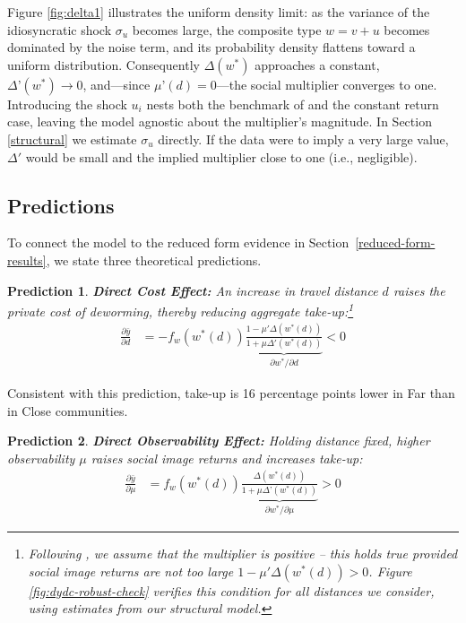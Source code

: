 \documentclass[12pt,a4paper]{article}
\newtheorem{prediction}{Prediction}
\begin{document}
Figure \ref{fig:delta1} illustrates the uniform density limit: as the variance of the idiosyncratic shock $\sigma_u$ becomes large, the composite type $w=v+u$ becomes dominated by the noise term, and its probability density flattens toward a uniform distribution. Consequently $\Delta(w^{\ast})$ approaches a constant, $\Delta’(w^{\ast})\to 0$, and---since $\mu’(d)=0$---the social multiplier converges to one. Introducing the shock \(u_{i}\) nests both the benchmark of \citet{Benabou_laws_2011} and the constant return case, leaving the model agnostic about the multiplier’s magnitude.  In Section \ref{structural} we estimate \(\sigma_{u}\) directly. If the data were to imply a very large value, \(\Delta'\) would be small and the implied multiplier close to one (i.e., negligible).

\subsection{Predictions}

To connect the model to the reduced form evidence in Section~\ref{reduced-form-results}, we state three theoretical predictions. 

\begin{prediction}\label{pred:cost} {\rm \textbf{Direct Cost Effect:}} An increase in travel distance $d$ raises the private cost of deworming, thereby reducing aggregate take-up:\footnote{Following \cite{Benabou_laws_2011}, we assume that the multiplier is positive -- this holds true provided social image returns are not too large $1 - \mu' \Delta(w^\ast(d)) > 0$. Figure \ref{fig:dydc-robust-check} verifies this condition for all distances we consider, using estimates from our structural model.}
\begin{align*}
\frac{\partial \bar{y}}{\partial d} &= - f_w(w^\ast(d)) \underbrace{\frac{1 - \mu' \Delta(w^\ast(d))}{1 + \mu \Delta'(w^\ast(d))}}_{\partial w^\ast / \partial d} < 0 \label{eq:marginal-effect-of-cost}
\end{align*}

\end{prediction}

Consistent with this prediction, take‑up is 16 percentage points lower in Far than in Close communities.


\begin{prediction}\label{pred:visibility} {\rm \textbf{Direct Observability Effect:}} Holding distance fixed, higher observability $\mu$ raises social image returns and increases take‑up:
\begin{align*}
\frac{\partial \bar{y}}{\partial \mu} &= f_w(w^\ast(d)) \underbrace{\frac{\Delta(w^\ast(d))}{1 + \mu\Delta’(w^\ast(d))}}_{\partial w ^\ast/\partial \mu} > 0
\end{align*}
\end{prediction}
\end{document}
